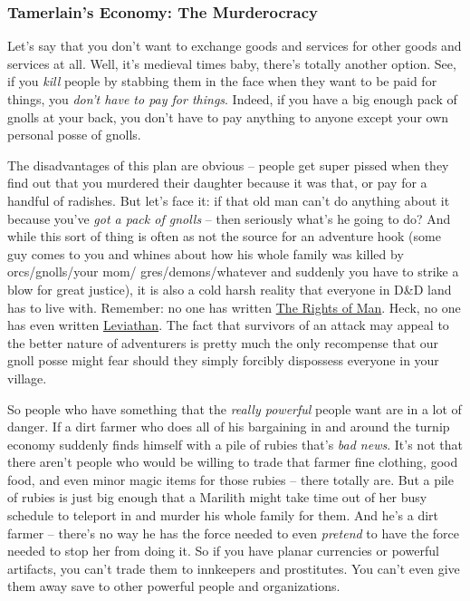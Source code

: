 \subsubsection{Tamerlain's Economy: The Murderocracy}
\vspace*{-8pt}

Let's say that you don't want to exchange goods and services for other goods and services at all. Well, it's medieval times baby, there's totally another option. See, if you \textit{kill} people by stabbing them in the face when they want to be paid for things, you \textit{don't have to pay for things}. Indeed, if you have a big enough pack of gnolls at your back, you don't have to pay anything to anyone except your own personal posse of gnolls.

The disadvantages of this plan are obvious -- people get super pissed when they find out that you murdered their daughter because it was that, or pay for a handful of radishes. But let's face it: if that old man can't do anything about it because you've \textit{got a pack of gnolls} -- then seriously what's he going to do? And while this sort of thing is often as not the source for an adventure hook (some guy comes to you and whines about how his whole family was killed by orcs/gnolls/your mom/ gres/demons/whatever and suddenly you have to strike a blow for great justice), it is also a cold harsh reality that everyone in D\&D land has to live with. Remember: no one has written \underline{The Rights of Man}. Heck, no one has even written \underline{Leviathan}. The fact that survivors of an attack may appeal to the better nature of adventurers is pretty much the only recompense that our gnoll posse might fear should they simply forcibly dispossess everyone in your village.

So people who have something that the \textit{really powerful} people want are in a lot of danger. If a dirt farmer who does all of his bargaining in and around the turnip economy suddenly finds himself with a pile of rubies that's \textit{bad news}. It's not that there aren't people who would be willing to trade that farmer fine clothing, good food, and even minor magic items for those rubies -- there totally are. But a pile of rubies is just big enough that a Marilith might take time out of her busy schedule to teleport in and murder his whole family for them. And he's a dirt farmer -- there's no way he has the force needed to even \textit{pretend} to have the force needed to stop her from doing it. So if you have planar currencies or powerful artifacts, you can't trade them to innkeepers and prostitutes. You can't even give them away save to other powerful people and organizations.

